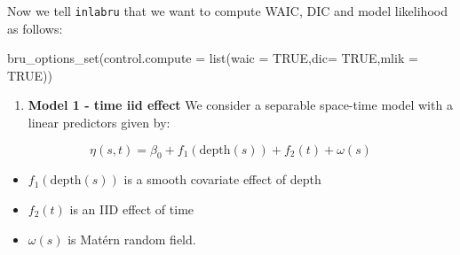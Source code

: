 \documentclass[
  letterpaper,
  DIV=11,
  numbers=noendperiod]{scrartcl}
\newenvironment{Shaded}{\begin{snugshade}}{\end{snugshade}}
\newcommand{\AttributeTok}[1]{\textcolor[rgb]{0.40,0.45,0.13}{#1}}
\newcommand{\CommentTok}[1]{\textcolor[rgb]{0.37,0.37,0.37}{#1}}
\newcommand{\ConstantTok}[1]{\textcolor[rgb]{0.56,0.35,0.01}{#1}}
\newcommand{\DecValTok}[1]{\textcolor[rgb]{0.68,0.00,0.00}{#1}}
\newcommand{\ErrorTok}[1]{\textcolor[rgb]{0.68,0.00,0.00}{#1}}
\newcommand{\FunctionTok}[1]{\textcolor[rgb]{0.28,0.35,0.67}{#1}}
\newcommand{\NormalTok}[1]{\textcolor[rgb]{0.00,0.23,0.31}{#1}}
\newcommand{\OtherTok}[1]{\textcolor[rgb]{0.00,0.23,0.31}{#1}}
\newcommand{\SpecialCharTok}[1]{\textcolor[rgb]{0.37,0.37,0.37}{#1}}
\newcommand{\StringTok}[1]{\textcolor[rgb]{0.13,0.47,0.30}{#1}}
\providecommand{\tightlist}{%
  \setlength{\itemsep}{0pt}\setlength{\parskip}{0pt}}\usepackage{longtable,booktabs,array}
\begin{document}
Now we tell \texttt{inlabru} that we want to compute WAIC, DIC and model
likelihood as follows:

\begin{Shaded}
\begin{Highlighting}[]
\FunctionTok{bru\_options\_set}\NormalTok{(}\AttributeTok{control.compute =} \FunctionTok{list}\NormalTok{(}\AttributeTok{waic =} \ConstantTok{TRUE}\NormalTok{,}\AttributeTok{dic=} \ConstantTok{TRUE}\NormalTok{,}\AttributeTok{mlik =} \ConstantTok{TRUE}\NormalTok{))}
\end{Highlighting}
\end{Shaded}

\begin{enumerate}
\def\labelenumi{\arabic{enumi}.}
\tightlist
\item
  \textbf{Model 1 - time iid effect} We consider a separable space-time
  model with a linear predictors given by:
\end{enumerate}

\[
\eta(s,t) = \beta_0 + f_1(\text{depth}(s)) + f_2(t) + \omega(s)
\]

\begin{itemize}
\item
  \(f_1(\text{depth}(s))\) is a smooth covariate effect of depth
\item
  \(f_2(t)\) is an IID effect of time
\item
  \(\omega(s)\) is Matérn random field.
\end{itemize}

\begin{Shaded}
\end{Shaded}
\end{document}
